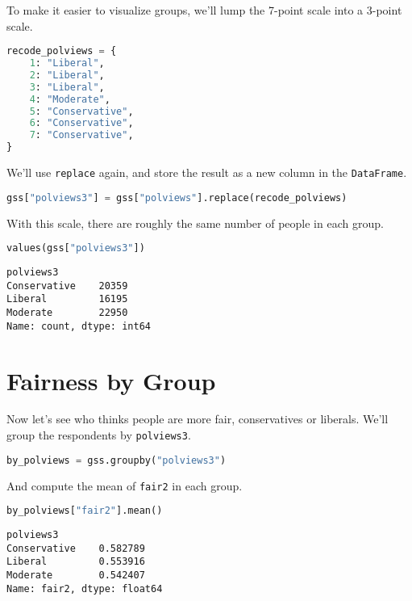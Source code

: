To make it easier to visualize groups, we'll lump the 7-point scale into
a 3-point scale.

\begin{lstlisting}[language=Python,style=source]
recode_polviews = {
    1: "Liberal",
    2: "Liberal",
    3: "Liberal",
    4: "Moderate",
    5: "Conservative",
    6: "Conservative",
    7: "Conservative",
}
\end{lstlisting}

We'll use \passthrough{\lstinline!replace!} again, and store the result
as a new column in the \passthrough{\lstinline!DataFrame!}.

\begin{lstlisting}[language=Python,style=source]
gss["polviews3"] = gss["polviews"].replace(recode_polviews)
\end{lstlisting}

With this scale, there are roughly the same number of people in each
group.

\begin{lstlisting}[language=Python,style=source]
values(gss["polviews3"])
\end{lstlisting}

\begin{lstlisting}[style=output]
polviews3
Conservative    20359
Liberal         16195
Moderate        22950
Name: count, dtype: int64
\end{lstlisting}

\hypertarget{fairness-by-group}{%
\section{Fairness by Group}\label{fairness-by-group}}

Now let's see who thinks people are more fair, conservatives or
liberals. We'll group the respondents by
\passthrough{\lstinline!polviews3!}.

\begin{lstlisting}[language=Python,style=source]
by_polviews = gss.groupby("polviews3")
\end{lstlisting}

And compute the mean of \passthrough{\lstinline!fair2!} in each group.

\begin{lstlisting}[language=Python,style=source]
by_polviews["fair2"].mean()
\end{lstlisting}

\begin{lstlisting}[style=output]
polviews3
Conservative    0.582789
Liberal         0.553916
Moderate        0.542407
Name: fair2, dtype: float64
\end{lstlisting}

